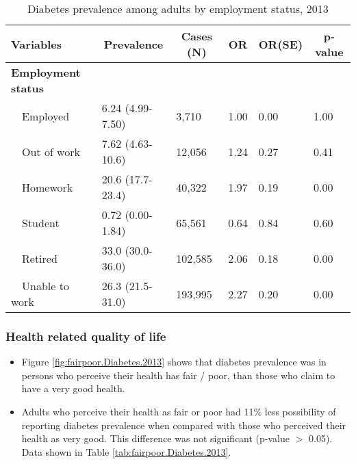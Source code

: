 \begin{table}[H]
\caption{Diabetes prevalence  among adults by employment status, 2013\label{tab:employ.Diabetes.2013}} 
\begin{center}
\begin{tabular}{llllll}
\hline\hline
\multicolumn{1}{l}{Variables}&\multicolumn{1}{c}{Prevalence}&\multicolumn{1}{c}{Cases (N)}&\multicolumn{1}{c}{OR}&\multicolumn{1}{c}{OR(SE)}&\multicolumn{1}{c}{p-value}\tabularnewline
\hline
{\bfseries Employment status}&&&&&\tabularnewline
~~Employed&6.24 (4.99-7.50)&  3,710&1.00&0.00&1.00\tabularnewline
~~Out of work&7.62 (4.63-10.6)& 12,056&1.24&0.27&0.41\tabularnewline
~~Homework&20.6 (17.7-23.4)& 40,322&1.97&0.19&0.00\tabularnewline
~~Student&0.72 (0.00-1.84)& 65,561&0.64&0.84&0.60\tabularnewline
~~Retired&33.0 (30.0-36.0)&102,585&2.06&0.18&0.00\tabularnewline
~~Unable to work&26.3 (21.5-31.0)&193,995&2.27&0.20&0.00\tabularnewline
\hline
\end{tabular}\end{center}

\end{table}


 \newpage
\subsubsection{Health related quality of life}


 \begin{itemize}

\item Figure \ref{fig:fairpoor.Diabetes.2013} shows that diabetes prevalence  was 
 in persons who perceive their health has fair / poor,
than those who claim to have a very good health.

\item Adults who perceive their health as fair or poor had 11\% less possibility of reporting diabetes prevalence when compared with those who perceived their health as very good. This difference was not significant (p-value $>$ 0.05). Data shown in Table \ref{tab:fairpoor.Diabetes.2013}.

\end{itemize}

